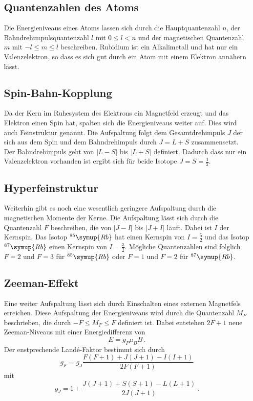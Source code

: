 \subsection{Quantenzahlen des Atoms}
\label{sec:Quantenzahlen}
Die Energieniveaus eines Atoms lassen sich durch die Hauptquantenzahl $n$, der Bahndrehimpulsquantenzahl $l$
mit $0 \leq l < n$ und der magnetischen Quantenzahl $m$ mit $-l \leq m \leq l$ beschreiben. Rubidium ist ein
Alkalimetall und hat nur ein Valenzelektron, so dass es sich gut durch ein Atom mit einem Elektron annähern lässt.

\subsection{Spin-Bahn-Kopplung}
\label{sec:Spin-Bahn-Kopplung}
Da der Kern im Ruhesystem des Elektrons ein Magnetfeld erzeugt und das Elektron einen Spin hat, spalten sich die
Energieniveaus weiter auf. Dies wird auch Feinstruktur genannt. Die Aufspaltung folgt dem Gesamtdrehimpuls $J$
der sich aus dem Spin und dem Bahndrehimpuls durch $J=L+S$ zusammensetzt. Der Bahndrehimpuls geht von $|L-S|$ bis
$|L+S|$ definiert. Dadurch dass nur ein Valenzelektron vorhanden ist ergibt sich für beide Isotope
$J=S=\frac{1}{2}$.

\subsection{Hyperfeinstruktur}
\label{sec:Hyperfeinstruktur}
Weiterhin gibt es noch eine wesentlich geringere Aufspaltung durch die magnetischen Momente der Kerne. Die
Aufspaltung lässt sich durch die Quantenzahl $F$ beschreiben, die von $|J-I|$ bis $|J+I|$ läuft. Dabei ist
$I$ der Kernspin. Das Isotop $^{85}\symup{Rb}$ hat einen Kernspin von $I=\frac{5}{2}$ und das Isotop
$^{87}\symup{Rb}$ einen Kernspin von $I=\frac{3}{2}$. Mögliche Quantenzahlen sind folglich $F=2$ und $F=3$
für $^{85}\symup{Rb}$ oder $F=1$ und $F=2$ für $^{87}\symup{Rb}$.

\subsection{Zeeman-Effekt}
\label{sec:Zeeman-Effekt}
Eine weiter Aufspaltung lässt sich durch Einschalten eines externen Magnetfels erreichen. Diese Aufspaltung
der Energieniveaus wird durch die Quantenzahl $M_F$ beschrieben, die durch $-F \leq M_F \leq F$ definiert ist.
Dabei entstehen $2F+1$ neue Zeeman-Niveaus mit einer Energiedifferenz von
\begin{equation}
    \label{eq:Ediff}
    E = g_F \mu_B B\,.
\end{equation}
Der enstprechende Land\'e-Faktor bestimmt sich durch
\begin{equation}
    \label{eq:gf}
    g_F = g_J \frac{F(F+1)+J(J+1)-I(I+1)}{2F(F+1)}
\end{equation}
mit
\begin{equation}
    \label{eq:gj}
    g_J = 1 + \frac{J(J+1)+S(S+1)-L(L+1)}{2J(J+1)}\,.
\end{equation}

